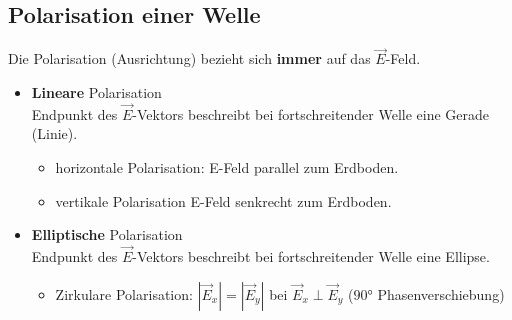 \subsection{Polarisation einer Welle}
Die Polarisation (Ausrichtung) bezieht sich \textbf{immer} auf das $\vec{E}$-Feld.
\begin{itemize}
	\item \textbf{Lineare} Polarisation\\
	Endpunkt des $\vec{E}$-Vektors beschreibt bei fortschreitender Welle eine Gerade (Linie).
		\begin{itemize}
				\item horizontale Polarisation: E-Feld parallel zum Erdboden.
				\item vertikale Polarisation E-Feld senkrecht zum Erdboden.
			\end{itemize}
	\item \textbf{Elliptische} Polarisation\\
	Endpunkt des $\vec{E}$-Vektors beschreibt bei fortschreitender Welle eine Ellipse.
		\begin{itemize}
				\item Zirkulare Polarisation: $|\vec{E}_x| = |\vec{E}_y|$ bei $ \vec{E}_x \perp \vec{E}_y $ ($ \ang{90}$ Phasenverschiebung)
			\end{itemize}
\end{itemize}
